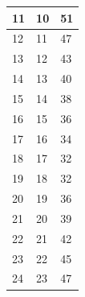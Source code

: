 \documentclass{report}
\begin{document}
\begin{table}[H]
\begin{tabular}{|l|l|l|}
11  & 10                                                                   & 51                                                               \\ \hline
12  & 11                                                                   & 47                                                               \\ \hline
13  & 12                                                                   & 43                                                               \\ \hline
14  & 13                                                                   & 40                                                               \\ \hline
15  & 14                                                                   & 38                                                               \\ \hline
16  & 15                                                                   & 36                                                               \\ \hline
17  & 16                                                                   & 34                                                               \\ \hline
18  & 17                                                                   & 32                                                               \\ \hline
19  & 18                                                                   & 32                                                               \\ \hline
20  & 19                                                                   & 36                                                               \\ \hline
21  & 20                                                                   & 39                                                               \\ \hline
22  & 21                                                                   & 42                                                               \\ \hline
23  & 22                                                                   & 45                                                               \\ \hline
24  & 23                                                                   & 47                                                               \\ \hline

\end{tabular}
\end{table}
\end{document}
